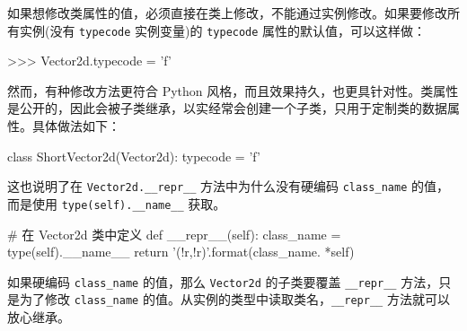 如果想修改类属性的值，必须直接在类上修改，不能通过实例修改。如果要修改所有实例(没有 \texttt{typecode} 实例变量)的 \texttt{typecode} 属性的默认值，可以这样做：

\begin{python}
>>> Vector2d.typecode = 'f'
\end{python}

然而，有种修改方法更符合 Python 风格，而且效果持久，也更具针对性。类属性是公开的，因此会被子类继承，以实经常会创建一个子类，只用于定制类的数据属性。具体做法如下：

\begin{python}
class ShortVector2d(Vector2d):
    typecode = 'f'
\end{python}

这也说明了在 \texttt{Vector2d.\_\_repr\_\_} 方法中为什么没有硬编码 \texttt{class\_name} 的值，而是使用 \texttt{type(self).\_\_name\_\_} 获取。

\begin{python}
# 在 Vector2d 类中定义
def __repr__(self):
    class_name = type(self).__name__
    return '{}({!r},{!r})'.format(class_name. *self)
\end{python}

如果硬编码 \texttt{class\_name} 的值，那么 \texttt{Vector2d} 的子类要覆盖 \texttt{\_\_repr\_\_} 方法，只是为了修改 \texttt{class\_name} 的值。从实例的类型中读取类名，\texttt{\_\_repr\_\_} 方法就可以放心继承。

\newpage